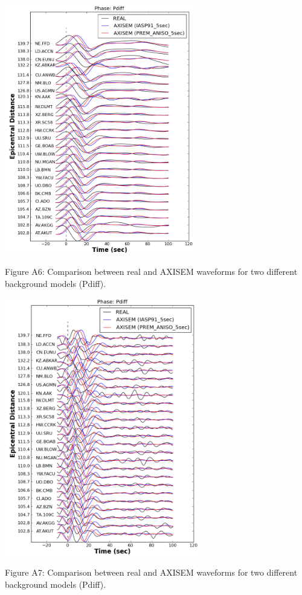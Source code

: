 \documentclass{article}
\begin{document}
\begin{center}
\includegraphics[width=234pt, height=310pt, keepaspectratio=true]{AXISEMTutorial-fig012.png}

{\small{}Figure A6: Comparison between real and AXISEM waveforms for two different 
background models (Pdiff).}

\includegraphics[width=241pt, height=320pt, keepaspectratio=true]{AXISEMTutorial-fig013.png}

{\small{}Figure A7: Comparison between real and AXISEM waveforms for two different 
background models (Pdiff).}
\end{center}
\end{document}
